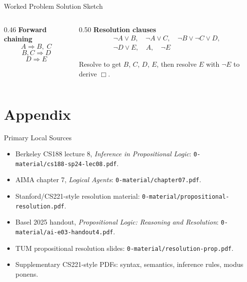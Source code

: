 \documentclass[aspectratio=169,11pt]{beamer}
\newcommand{\minihead}[1]{\textbf{\color{unswblue}#1}}
\begin{document}
\begin{frame}{Worked Problem Solution Sketch}
  \begin{columns}[T,onlytextwidth]
    \begin{column}{0.46\textwidth}
      \minihead{Forward chaining}
      \[
        A \Rightarrow B,\; C
      \]
      \[
        B,C \Rightarrow D
      \]
      \[
        D \Rightarrow E
      \]
    \end{column}
    \begin{column}{0.50\textwidth}
      \minihead{Resolution clauses}
      \[
      \begin{aligned}
        &\neg A \lor B,\quad \neg A \lor C,\quad \neg B \lor \neg C \lor D,\\
        &\neg D \lor E,\quad A,\quad \neg E
      \end{aligned}
      \]

      Resolve to get $B$, $C$, $D$, $E$, then resolve $E$ with $\neg E$ to derive $\Box$.
    \end{column}
  \end{columns}
\end{frame}

\appendix
\section{Appendix}

\begin{frame}{Primary Local Sources}
  \small
  \begin{itemize}
    \item Berkeley CS188 lecture 8, \textit{Inference in Propositional Logic}: \texttt{0-material/cs188-sp24-lec08.pdf}.
    \item AIMA chapter 7, \textit{Logical Agents}: \texttt{0-material/chapter07.pdf}.
    \item Stanford/CS221-style resolution material: \texttt{0-material/propositional-resolution.pdf}.
    \item Basel 2025 handout, \textit{Propositional Logic: Reasoning and Resolution}: \texttt{0-material/ai-e03-handout4.pdf}.
    \item TUM propositional resolution slides: \texttt{0-material/resolution-prop.pdf}.
    \item Supplementary CS221-style PDFs: syntax, semantics, inference rules, modus ponens.
  \end{itemize}
\end{frame}
\end{document}
